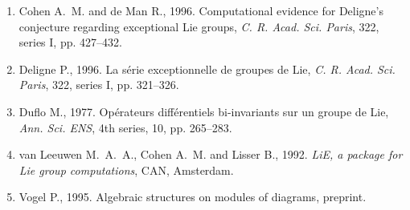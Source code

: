 \documentclass[11pt,a4paper]{article}
\theoremstyle{plain}
\theoremstyle{definition}
\begin{document}
\begin{enumerate}
\item[{[1]}] Cohen A.~M. and de Man R., 1996. Computational evidence for Deligne's conjecture regarding exceptional Lie groups, \textit{C. R. Acad. Sci. Paris}, 322, series I, pp. 427--432.
\item[{[2]}] Deligne P., 1996. La s\'erie exceptionnelle de groupes de Lie, \textit{C. R. Acad. Sci. Paris}, 322, series I, pp. 321--326.
\item[{[3]}] Duflo M., 1977. Op\'erateurs diff\'erentiels bi-invariants sur un groupe de Lie, \textit{Ann. Sci. ENS}, 4th series, 10, pp. 265--283.
\item[{[4]}] van Leeuwen M.~A.~A., Cohen A.~M. and Lisser B., 1992. \textit{LiE, a package for Lie group computations}, CAN, Amsterdam.
\item[{[5]}] Vogel P., 1995. Algebraic structures on modules of diagrams, preprint.
\end{enumerate}
\end{document}
